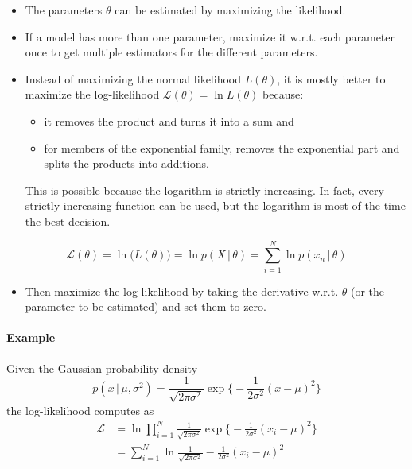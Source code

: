 \documentclass[a4paper, 11pt, accentcolor = tud3b]{tudreport}
\newcommand{\given}{\ensuremath{\,\vert\,}}
\begin{document}
				\begin{itemize}
					\item The parameters \(\theta\) can be estimated by maximizing the likelihood.
					\item If a model has more than one parameter, maximize it w.r.t. each parameter once to get multiple estimators for the different parameters.
					\item Instead of maximizing the normal likelihood \(L(\theta)\), it is mostly better to maximize the log-likelihood \( \mathcal{L}(\theta) = \ln L(\theta) \) because:
						\begin{itemize}
							\item it removes the product and turns it into a sum and
							\item for members of the exponential family, removes the exponential part and splits the products into additions.
						\end{itemize}
						This is possible because the logarithm is strictly increasing. In fact, every strictly increasing function can be used, but the logarithm is most of the time the best decision.
				\end{itemize}
				\begin{equation}
					\mathcal{L}(\theta) = \ln\big(L(\theta)\big) = \ln p(X \given \theta) = \sum_{i = 1}^{N} \ln p(x_n \given \theta)
				\end{equation}
				\begin{itemize}
					\item Then maximize the log-likelihood by taking the derivative w.r.t. \(\theta\) (or the parameter to be estimated) and set them to zero.
				\end{itemize}

				\paragraph{Example}
					Given the Gaussian probability density
					\begin{equation}
						p(x \given \mu, \sigma^2) = \frac{1}{\sqrt{2\pi\sigma^2}} \exp\Bigg\{ -\frac{1}{2\sigma^2} (x - \mu)^2 \Bigg\}
					\end{equation}
					the log-likelihood computes as
					\begin{align}
						\mathcal{L} &= \ln \prod_{i = 1}^{N} \frac{1}{\sqrt{2\pi\sigma^2}} \exp\Bigg\{ -\frac{1}{2\sigma^2} (x_i - \mu)^2 \Bigg\} \\
							&= \sum_{i = 1}^{N} \ln \frac{1}{\sqrt{2\pi\sigma^2}} - \frac{1}{2\sigma^2} (x_i - \mu)^2
					\end{align}
\end{document}
